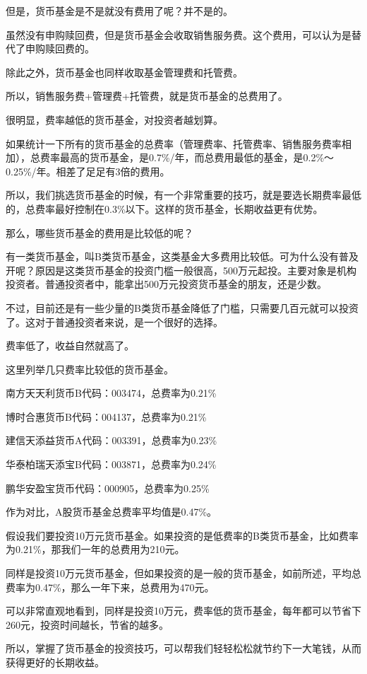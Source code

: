 但是，货币基金是不是就没有费用了呢？并不是的。

虽然没有申购赎回费，但是货币基金会收取销售服务费。这个费用，可以认为是替代了申购赎回费的。

除此之外，货币基金也同样收取基金管理费和托管费。

所以，销售服务费+管理费+托管费，就是货币基金的总费用了。

很明显，费率越低的货币基金，对投资者越划算。

如果统计一下所有的货币基金的总费率（管理费率、托管费率、销售服务费率相加），总费率最高的货币基金，是0.7\%/年，而总费用最低的基金，是0.2\%～0.25\%/年。相差了足足有3倍的费用。

所以，我们挑选货币基金的时候，有一个非常重要的技巧，就是要选长期费率最低的，总费率最好控制在0.3\%以下。这样的货币基金，长期收益更有优势。

那么，哪些货币基金的费用是比较低的呢？

有一类货币基金，叫B类货币基金，这类基金大多费用比较低。可为什么没有普及开呢？原因是这类货币基金的投资门槛一般很高，500万元起投。主要对象是机构投资者。普通投资者中，能拿出500万元投资货币基金的朋友，还是少数。

不过，目前还是有一些少量的B类货币基金降低了门槛，只需要几百元就可以投资了。这对于普通投资者来说，是一个很好的选择。

费率低了，收益自然就高了。

这里列举几只费率比较低的货币基金。

{\kaishu 南方天天利货币B代码：003474，总费率为0.21\%}

{\kaishu 博时合惠货币B代码：004137，总费率为0.21\%}

{\kaishu 建信天添益货币A代码：003391，总费率为0.23\%}

{\kaishu 华泰柏瑞天添宝B代码：003871，总费率为0.24\%}

{\kaishu 鹏华安盈宝货币代码：000905，总费率为0.25\%}

作为对比，A股货币基金总费率平均值是0.47\%。

假设我们要投资10万元货币基金。如果投资的是低费率的B类货币基金，比如费率为0.21\%，那我们一年的总费用为210元。

同样是投资10万元货币基金，但如果投资的是一般的货币基金，如前所述，平均总费率为0.47\%，那么一年下来，总费用为470元。

可以非常直观地看到，同样是投资10万元，费率低的货币基金，每年都可以节省下260元，投资时间越长，节省的越多。

所以，掌握了货币基金的投资技巧，可以帮我们轻轻松松就节约下一大笔钱，从而获得更好的长期收益。

